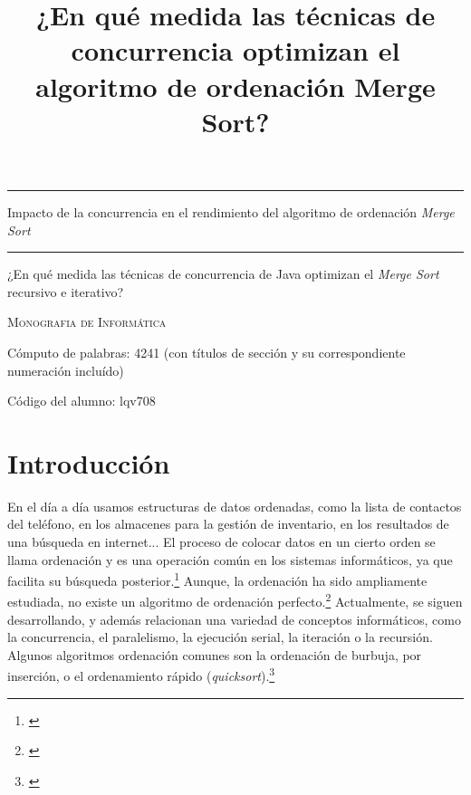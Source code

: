 \documentclass[titlepage]{article}
\title{¿En qué medida las técnicas de concurrencia optimizan el algoritmo de ordenación Merge Sort?}
\begin{document}
	
	
\begin{titlepage}
	\centering
	\hfill
	\vspace{3cm}
	
	\hrule
	\vspace{1cm}
	\onehalfspacing
	{\Huge Impacto de la concurrencia en el rendimiento del algoritmo de ordenación \textit{Merge Sort}\par}
	\vspace{1cm}
	\hrule
	
	\vspace{1cm}
	{\LARGE ¿En qué medida las técnicas de concurrencia de Java optimizan el \textit{Merge Sort} recursivo e iterativo? \par}
	
	\vspace{1cm}
	
	{\scshape\large Monografia de Informática\par}
	
	\vspace{8cm}
	
	{\large Cómputo de palabras: 4241 (con títulos de sección y su correspondiente numeración incluído) \par}
	{\large Código del alumno: lqv708 \par}
	
	
\end{titlepage}

\newpage
\tableofcontents

\newpage
\section{Introducción} %
En el día a día usamos estructuras de datos ordenadas, como la lista de contactos del teléfono, en los almacenes para la gestión de inventario, en los resultados de una búsqueda en internet... El proceso de colocar datos en un cierto orden se llama ordenación y es una operación común en los sistemas informáticos, ya que facilita su búsqueda posterior.\footnote{\cite{knuth-1997}} Aunque, la ordenación ha sido ampliamente estudiada, no existe un algoritmo de ordenación perfecto.\footnote{\cite{McMillan-2007}} Actualmente, se siguen desarrollando, y además relacionan una variedad de conceptos informáticos, como la concurrencia, el paralelismo, la ejecución serial, la iteración o la recursión. Algunos algoritmos ordenación comunes son la ordenación de burbuja, por inserción, o el ordenamiento rápido (\textit{quicksort}).\footnote{\cite{pandey2008study}}
\end{document}
